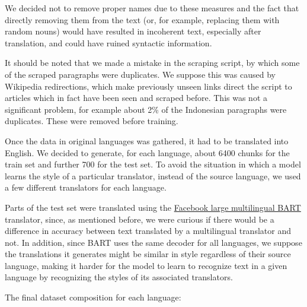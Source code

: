 \documentclass[twocolumn]{article}
\begin{document}
We decided not to remove proper names due to these measures and the fact that directly removing them from the text (or, for example, replacing them with random nouns) would have resulted in incoherent text, especially after translation, and could have ruined syntactic information.

It should be noted that we made a mistake in the scraping script, by which some of the scraped paragraphs were duplicates. We suppose this was caused by Wikipedia redirections, which make previously unseen links direct the script to articles which in fact have been seen and scraped before. This was not a significant problem, for example about 2\% of the Indonesian paragraphs were duplicates. These were removed before training.

Once the data in original languages was gathered, it had to be translated into English. We decided to generate, for each language, about 6400 chunks for the train set and further 700 for the test set. To avoid the situation in which a model learns the style of a particular translator, instead of the source language, we used a few different translators for each language.

Parts of the test set were translated using the \href{https://huggingface.co/facebook/mbart-large-50-many-to-one-mmt}{Facebook large multilingual BART} translator, since, as mentioned before, we were curious if there would be a difference in accuracy between text translated by a multilingual translator and not. In addition, since BART uses the same decoder for all languages, we suppose the translations it generates might be similar in style regardless of their source language, making it harder for the model to learn to recognize text in a given language by recognizing the styles of its associated translators.

The final dataset composition for each language:
\end{document}
